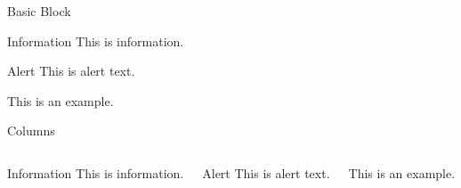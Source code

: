 \documentclass{beamer}
\begin{document}
	\begin{frame}{Basic Block}
		\begin{block}{Information}
			This is information.
		\end{block}
		
		\begin{alertblock}{Alert}
			This is alert text.
		\end{alertblock}
		
		\begin{example}
			This is an example.
		\end{example}
	\end{frame}
	
	\begin{frame}{Columns}
		\begin{columns}
			\begin{block}{Information}
				This is information.
			\end{block}
			
			\begin{alertblock}{Alert}
				This is alert text.
			\end{alertblock}
			
			\begin{example}
				This is an example.
			\end{example}
		\end{columns}
	\end{frame}
\end{document}
